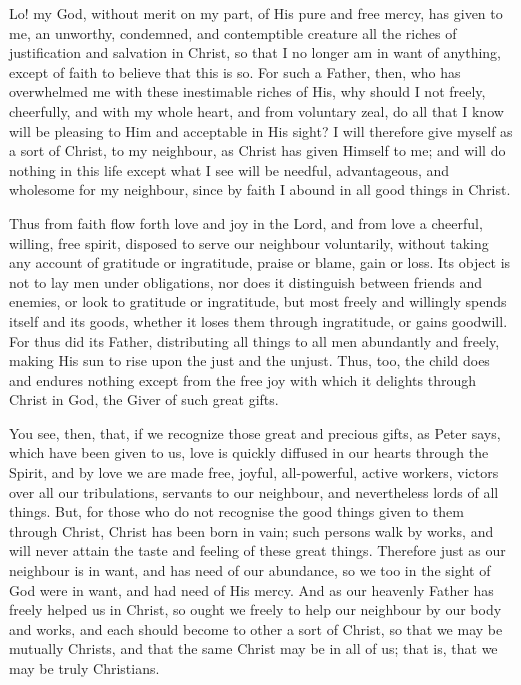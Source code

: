 Lo! my God, without merit on my part, of His pure and free mercy, has
given to me, an unworthy, condemned, and contemptible creature all the
riches of justification and salvation in Christ, so that I no longer am in
want of anything, except of faith to believe that this is so. For such a
Father, then, who has overwhelmed me with these inestimable riches of His,
why should I not freely, cheerfully, and with my whole heart, and from
voluntary zeal, do all that I know will be pleasing to Him and acceptable
in His sight? I will therefore give myself as a sort of Christ, to my
neighbour, as Christ has given Himself to me; and will do nothing in this
life except what I see will be needful, advantageous, and wholesome for my
neighbour, since by faith I abound in all good things in Christ.

Thus from faith flow forth love and joy in the Lord, and from love a
cheerful, willing, free spirit, disposed to serve our neighbour
voluntarily, without taking any account of gratitude or ingratitude,
praise or blame, gain or loss. Its object is not to lay men under
obligations, nor does it distinguish between friends and enemies, or look
to gratitude or ingratitude, but most freely and willingly spends itself
and its goods, whether it loses them through ingratitude, or gains
goodwill. For thus did its Father, distributing all things to all men
abundantly and freely, making His sun to rise upon the just and the
unjust. Thus, too, the child does and endures nothing except from the free
joy with which it delights through Christ in God, the Giver of such great
gifts.

You see, then, that, if we recognize those great and precious gifts, as
Peter says, which have been given to us, love is quickly diffused in our
hearts through the Spirit, and by love we are made free, joyful,
all-powerful, active workers, victors over all our tribulations, servants
to our neighbour, and nevertheless lords of all things. But, for those who
do not recognise the good things given to them through Christ, Christ has
been born in vain; such persons walk by works, and will never attain the
taste and feeling of these great things. Therefore just as our neighbour
is in want, and has need of our abundance, so we too in the sight of God
were in want, and had need of His mercy. And as our heavenly Father has
freely helped us in Christ, so ought we freely to help our neighbour by
our body and works, and each should become to other a sort of Christ, so
that we may be mutually Christs, and that the same Christ may be in all of
us; that is, that we may be truly Christians.

